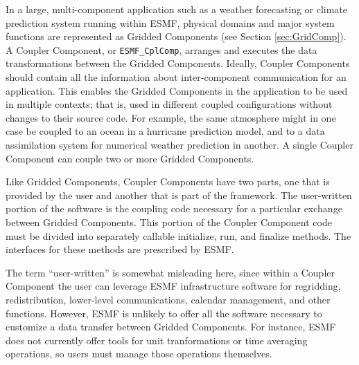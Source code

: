 %

\label{sec:CplComp}

In a large, multi-component application such as a weather 
forecasting or climate prediction system running within ESMF, 
physical domains and major system functions are represented 
as Gridded Components 
(see Section \ref{sec:GridComp}).  A Coupler Component, or 
{\tt ESMF\_CplComp}, arranges and executes the data 
transformations between the Gridded Components.  Ideally, 
Coupler Components should contain all the information 
about inter-component communication for an application.
This enables the Gridded Components in the application to be 
used in multiple contexts; that is, used in different coupled 
configurations without changes to their source code. 
For example, the same atmosphere might in one case be coupled 
to an ocean in a hurricane prediction model, and to a 
data assimilation system for numerical weather prediction in
another.  A single Coupler Component can couple 
two or more Gridded Components.

Like Gridded Components, Coupler Components have two parts, one
that is provided by the user and another that is part of the 
framework.  The user-written portion of the software is the coupling
code necessary for a particular exchange between Gridded Components.  
This portion of the Coupler Component code must be divided into 
separately callable initialize, run, and finalize methods.  The 
interfaces for these methods are prescribed by ESMF.

The term ``user-written'' is somewhat misleading here, since within 
a Coupler Component the user can leverage ESMF infrastructure 
software for regridding, redistribution, lower-level communications, 
calendar management, and other functions.  However, ESMF is unlikely 
to offer all the software necessary to customize a data transfer
between Gridded Components.  For instance, ESMF does not currently 
offer tools for unit tranformations or time averaging operations, 
so users must manage those operations themselves.

